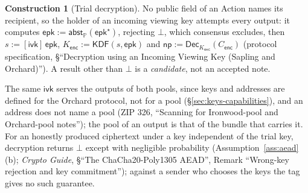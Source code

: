 \documentclass[11pt,a4paper]{article}
\theoremstyle{definition}
\newtheorem{construction}[theorem]{Construction}
\newcommand{\PP}{\mathbb{P}}
\newcommand{\ivk}{\ensuremath{\mathsf{ivk}}}
\begin{document}
\begin{construction}[Trial decryption]
No public field of an Action names its recipient, so the holder of an
incoming viewing key attempts every output: it computes
$\mathsf{epk} := \mathsf{abst}_{\PP}(\mathsf{epk}^{\star})$, rejecting
$\bot$, which consensus excludes, then
$s := [\ivk]\,\mathsf{epk}$, $K_{\mathsf{enc}} := \mathsf{KDF}(s,
\mathsf{epk})$ and $\mathsf{np} := \mathsf{Dec}_{K_{\mathsf{enc}}}(
C_{\mathsf{enc}})$ (protocol specification, \S``Decryption using an Incoming
Viewing Key (Sapling and Orchard)''). A result other than $\bot$ is a
\emph{candidate}, not an accepted note.
\end{construction}

The same $\ivk$ serves the outputs of both pools, since keys and addresses
are defined for the Orchard protocol, not for a pool
(\S\ref{sec:keys-capabilities}), and an address does not name a pool (ZIP
326, ``Scanning for Ironwood-pool and Orchard-pool notes''); the pool of an
output is that of the bundle that carries it. For an honestly produced
ciphertext under a key independent of the trial key, decryption returns
$\bot$ except with negligible probability (Assumption~\ref{ass:aead}(b);
\emph{Crypto Guide}, \S``The ChaCha20-Poly1305 AEAD'', Remark ``Wrong-key
rejection and key commitment''); against a sender who chooses the keys the
tag gives no such guarantee.
\end{document}
